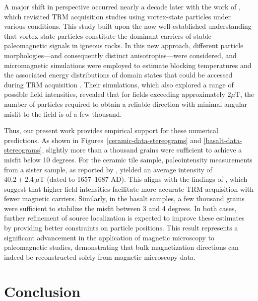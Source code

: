 A major shift in perspective occurred nearly a decade later with the work of \citet{Bellon2025}, which revisited TRM acquisition studies using vortex-state particles under various conditions. This study built upon the now well-established understanding that vortex-state particles constitute the dominant carriers of stable paleomagnetic signals in igneous rocks. In this new approach, different particle morphologies—and consequently distinct anisotropies—were considered, and micromagnetic simulations were employed to estimate blocking temperatures and the associated energy distributions of domain states that could be accessed during TRM acquisition \citep{Bellon2025}. Their simulations, which also explored a range of possible field intensities, revealed that for fields exceeding approximately $2 \mu \text{T}$, the number of particles required to obtain a reliable direction with minimal angular misfit to the field is of a few thousand.
 
Thus, our present work provides empirical support for these numerical predictions. As shown in Figures~\ref{ceramic-data-stereograms} and \ref{basalt-data-stereograms}, slightly more than a thousand grains were sufficient to achieve a misfit below 10 degrees. For the ceramic tile sample, paleointensity measurements from a sister sample, as reported by \citet{Poletti2016}, yielded an average intensity of $40.2 \pm 2.4\ \mu\text{T}$ (dated to 1657–1687 AD). This aligns with the findings of \citet{Bellon2025}, which suggest that higher field intensities facilitate more accurate TRM acquisition with fewer magnetic carriers. Similarly, in the basalt samples, a few thousand grains were sufficient to stabilize the misfit between 3 and 4 degrees.  
In both cases, further refinement of source localization is expected to improve these estimates by providing better constraints on particle positions. This result represents a significant advancement in the application of magnetic microscopy to paleomagnetic studies, demonstrating that bulk magnetization directions can indeed be reconstructed solely from magnetic microscopy data.



\section{Conclusion}

